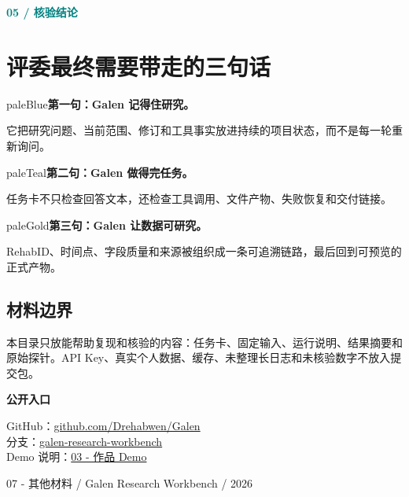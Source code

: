 \documentclass[UTF8,11pt,a4paper]{ctexart}
\newcommand{\kicker}[1]{\textcolor{teal}{\textbf{\small\MakeUppercase{#1}}}\par\vspace{1mm}}
\begin{document}
\kicker{05  /  核验结论}
\section*{评委最终需要带走的三句话}
\begin{card}[colframe=blue]{paleBlue}\textbf{第一句：Galen 记得住研究。}\par 它把研究问题、当前范围、修订和工具事实放进持续的项目状态，而不是每一轮重新询问。\end{card}
\begin{card}[colframe=teal]{paleTeal}\textbf{第二句：Galen 做得完任务。}\par 任务卡不只检查回答文本，还检查工具调用、文件产物、失败恢复和交付链接。\end{card}
\begin{card}[colframe=orange]{paleGold}\textbf{第三句：Galen 让数据可研究。}\par RehabID、时间点、字段质量和来源被组织成一条可追溯链路，最后回到可预览的正式产物。\end{card}

\subsection*{材料边界}
本目录只放能帮助复现和核验的内容：任务卡、固定输入、运行说明、结果摘要和原始探针。API Key、真实个人数据、缓存、未整理长日志和未核验数字不放入提交包。

\vspace{8mm}
\begin{darkbox}
\textbf{公开入口}\par
GitHub：\href{https://github.com/Drehabwen/Galen}{github.com/Drehabwen/Galen}\\
分支：\href{https://github.com/Drehabwen/Galen/tree/galen-research-workbench}{galen-research-workbench}\\
Demo 说明：\href{https://github.com/Drehabwen/Galen/tree/galen-research-workbench/rust/crates/galen/docs/competition-2026/XH-202620-submission-kit/03-%E4%BD%9C%E5%93%81Demo}{03 - 作品 Demo}
\end{darkbox}

\vfill
\begin{center}\color{muted}\small 07 - 其他材料  /  Galen Research Workbench  /  2026\end{center}
\end{document}
